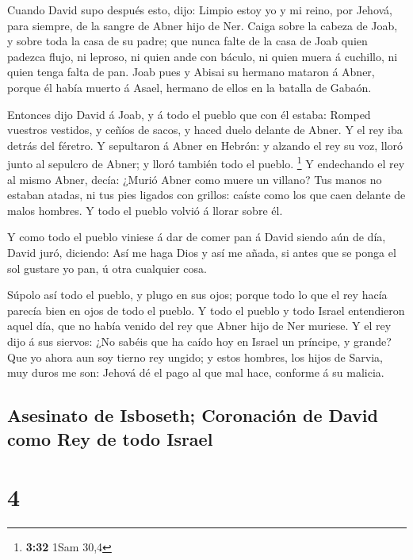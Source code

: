  Cuando David supo después esto, dijo: Limpio estoy yo y
mi reino, por Jehová, para siempre, de la sangre de Abner hijo de Ner.
 Caiga sobre la cabeza de Joab, y sobre toda la casa de
su padre; que nunca falte de la casa de Joab quien padezca flujo, ni
leproso, ni quien ande con báculo, ni quien muera á cuchillo, ni quien
tenga falta de pan.  Joab pues y Abisai su hermano
mataron á Abner, porque él había muerto á Asael, hermano de ellos en la
batalla de Gabaón.

 Entonces dijo David á Joab, y á todo el pueblo que con
él estaba: Romped vuestros vestidos, y ceñíos de sacos, y haced duelo
delante de Abner. Y el rey iba detrás del féretro.  Y
sepultaron á Abner en Hebrón: y alzando el rey su voz, lloró junto al
sepulcro de Abner; y lloró también todo el pueblo. \footnote{\textbf{3:32}
  1Sam 30,4}  Y endechando el rey al mismo Abner, decía:
¿Murió Abner como muere un villano?  Tus manos no estaban
atadas, ni tus pies ligados con grillos: caíste como los que caen
delante de malos hombres. Y todo el pueblo volvió á llorar sobre él.

 Y como todo el pueblo viniese á dar de comer pan á David
siendo aún de día, David juró, diciendo: Así me haga Dios y así me
añada, si antes que se ponga el sol gustare yo pan, ú otra cualquier
cosa.

 Súpolo así todo el pueblo, y plugo en sus ojos; porque
todo lo que el rey hacía parecía bien en ojos de todo el pueblo.
 Y todo el pueblo y todo Israel entendieron aquel día,
que no había venido del rey que Abner hijo de Ner muriese.
 Y el rey dijo á sus siervos: ¿No sabéis que ha caído hoy
en Israel un príncipe, y grande?  Que yo ahora aun soy
tierno rey ungido; y estos hombres, los hijos de Sarvia, muy duros me
son: Jehová dé el pago al que mal hace, conforme á su malicia.

\hypertarget{asesinato-de-isboseth-coronaciuxf3n-de-david-como-rey-de-todo-israel}{%
\subsection{Asesinato de Isboseth; Coronación de David como Rey de todo
Israel}\label{asesinato-de-isboseth-coronaciuxf3n-de-david-como-rey-de-todo-israel}}

\hypertarget{section-3}{%
\section{4}\label{section-3}}

